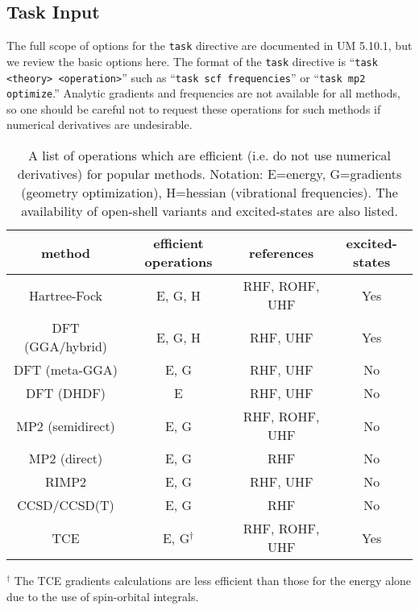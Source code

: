 \documentclass[letterpaper,12pt]{article}
\begin{document}
\newpage

\subsection{Task Input}\label{sec:TaskInput}

The full scope of options for the \texttt{task} directive are documented in UM 5.10.1, but we review the basic options here.  The format of the \texttt{task} directive is ``\texttt{task <theory> <operation>}'' such as ``\texttt{task scf frequencies}'' or ``\texttt{task mp2 optimize}.''  Analytic gradients and frequencies are not available for all methods, so one should be careful not to request these operations for such methods if numerical derivatives are undesirable.

\begin{table}[!hp]
    \label{tab:TaskOptions}
    \caption{A list of operations which are efficient (i.e. do not use numerical derivatives) for popular methods.  Notation: E=energy, G=gradients (geometry optimization), H=hessian (vibrational frequencies).  The availability of open-shell variants and excited-states are also listed.}
    \begin{tabular}{cccc}
        \hline\hline
        method           & efficient operations & references & excited-states \\
        \hline
        Hartree-Fock     & E, G, H       & RHF, ROHF, UHF & Yes \\
        DFT (GGA/hybrid) & E, G, H       & RHF, UHF       & Yes \\
        DFT (meta-GGA)   & E, G          & RHF, UHF       & No  \\
        DFT (DHDF)       & E             & RHF, UHF       & No  \\
        MP2 (semidirect) & E, G          & RHF, ROHF, UHF & No  \\
        MP2 (direct)     & E, G          & RHF            & No  \\
        RIMP2            & E, G          & RHF, UHF       & No  \\
        CCSD/CCSD(T)     & E, G          & RHF            & No  \\
        TCE              & E, G$^{\dag}$ & RHF, ROHF, UHF & Yes \\
        \hline\hline
    \end{tabular}
    $^{\dag}$ The TCE gradients calculations are less efficient than those for the energy alone due to the use of spin-orbital integrals.
\end{table}
\end{document}
